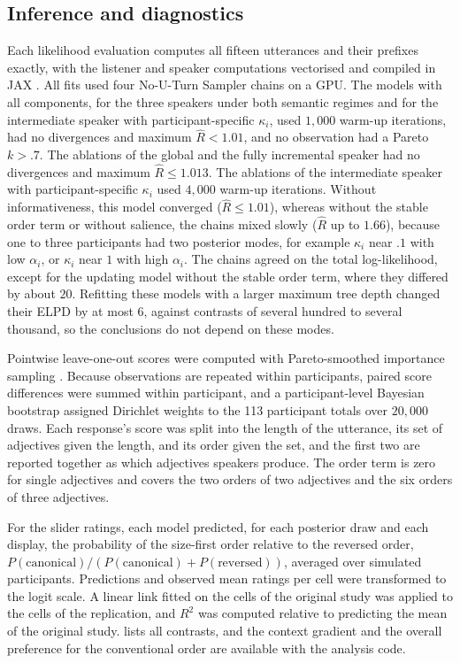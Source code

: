\documentclass[10pt,a4paper,fleqn]{article}
\begin{document}
\subsection{Inference and diagnostics}

Each likelihood evaluation computes all fifteen utterances and their prefixes exactly, with the listener and speaker computations vectorised and compiled in JAX \citep{jax2018github}.
All fits used four No-U-Turn Sampler chains on a GPU.
The models with all components, for the three speakers under both semantic regimes and for the intermediate speaker with participant-specific $\kappa_i$, used $1{,}000$ warm-up iterations, had no divergences and maximum $\widehat R<1.01$, and no observation had a Pareto $k>.7$.
The ablations of the global and the fully incremental speaker had no divergences and maximum $\widehat R\leq1.013$.
The ablations of the intermediate speaker with participant-specific $\kappa_i$ used $4{,}000$ warm-up iterations.
Without informativeness, this model converged ($\widehat R\leq1.01$), whereas without the stable order term or without salience, the chains mixed slowly ($\widehat R$ up to $1.66$), because one to three participants had two posterior modes, for example $\kappa_i$ near $.1$ with low $\alpha_i$, or $\kappa_i$ near $1$ with high $\alpha_i$.
The chains agreed on the total log-likelihood, except for the updating model without the stable order term, where they differed by about $20$.
Refitting these models with a larger maximum tree depth changed their ELPD by at most $6$, against contrasts of several hundred to several thousand, so the conclusions do not depend on these modes.

Pointwise leave-one-out scores were computed with Pareto-smoothed importance sampling \citep{vehtari2017practical}.
Because observations are repeated within participants, paired score differences were summed within participant, and a participant-level Bayesian bootstrap assigned Dirichlet weights to the 113 participant totals over $20{,}000$ draws.
Each response's score was split into the length of the utterance, its set of adjectives given the length, and its order given the set, and the first two are reported together as which adjectives speakers produce.
The order term is zero for single adjectives and covers the two orders of two adjectives and the six orders of three adjectives.

For the slider ratings, each model predicted, for each posterior draw and each display, the probability of the size-first order relative to the reversed order, $P(\text{canonical})/(P(\text{canonical})+P(\text{reversed}))$, averaged over simulated participants.
Predictions and observed mean ratings per cell were transformed to the logit scale.
A linear link fitted on the cells of the original study was applied to the cells of the replication, and $R^2$ was computed relative to predicting the mean of the original study.
 lists all contrasts, and the context gradient and the overall preference for the conventional order are available with the analysis code.
\end{document}
